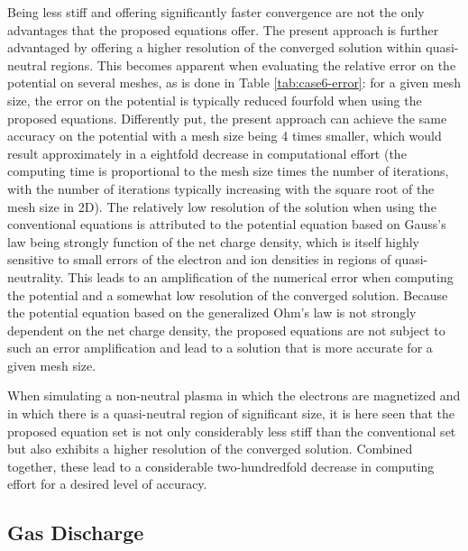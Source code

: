 \documentclass[twoside,onecolumn,10pt]{waflarticle}
\begin{document}
Being less stiff and offering significantly faster convergence are not the only advantages that the proposed equations offer. The present approach is further  advantaged by offering a higher resolution of the converged solution within quasi-neutral regions. This becomes apparent when evaluating the relative error on the potential on several meshes, as is done in Table \ref{tab:case6-error}: for a given mesh size, the error on the potential is typically reduced fourfold when using the proposed equations. Differently put, the present approach can achieve the same accuracy on the potential with a mesh size being 4 times smaller, which would result approximately in a eightfold decrease in computational effort  (the computing time is proportional to the mesh size times the number of iterations, with the number of iterations typically increasing with the square root of the mesh size in 2D). The relatively low resolution of the solution when using the conventional equations is attributed to the potential equation based on Gauss's law being strongly function of the net charge density, which is itself highly sensitive to small errors of the electron and ion densities in regions of quasi-neutrality. This leads to an amplification of the numerical error when computing the potential and a somewhat low resolution of the converged solution. Because the potential equation based on the generalized Ohm's law is not strongly dependent on the net charge density, the proposed equations are not subject to such an error amplification and lead to a solution that is more accurate for a given mesh size. 

When simulating a non-neutral plasma in which the electrons are magnetized and in which there is a quasi-neutral region of significant size, it is here seen that the proposed equation set is not only considerably less stiff than the conventional set but also exhibits a higher resolution of the converged solution. Combined together, these lead to a considerable two-hundredfold decrease in computing effort for a desired level of accuracy. 





\subsection{Gas Discharge}
\end{document}
